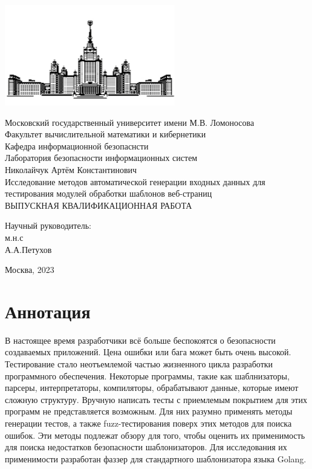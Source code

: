 \documentclass[a4paper]{article}
\begin{document}
 
\begin{center}
\includegraphics{MSU}

\hfill \break
\normalsize{Московский государственный университет имени М.В. Ломоносова}\\
\normalsize{Факультет вычислительной математики и кибернетики}\\
\normalsize{Кафедра информационной безопаснсти}\\
\normalsize{Лаборатория безопасности информационных систем}\\
 \hfill \break
\normalsize{Николайчук Артём Константинович}\\
\hfill\break
\hfill \break
\hfill \break
\hfill \break
\large{Исследование методов автоматической генерации входных данных для тестирования модулей обработки шаблонов веб-страниц}\\
\hfill \break
\hfill \break
\hfill \break
\normalsize{ВЫПУСКНАЯ КВАЛИФИКАЦИОННАЯ РАБОТА}\\
\hfill \break
\hfill \break
\hfill \break
\hfill \break
\hfill \break
\hfill \break
\hfill \break
\hfill \break
\begin{flushright}
    \normalsize{Научный руководитель:}\\
    \normalsize{м.н.с}\\
    \normalsize{А.А.Петухов}\\
\end{flushright}
\end{center}
\vspace*{\fill}
\begin{center} Москва, 2023 \end{center}
\thispagestyle{empty}
 
\newpage
\section*{Аннотация}
\indent

В настоящее время разработчики всё больше беспокоятся о безопасности создаваемых приложений. Цена ошибки или бага может быть очень высокой. Тестирование стало неотъемлемой частью жизненного цикла разработки программного обеспечения. Некоторые программы, такие как шаблнизаторы, парсеры, интерпретаторы, компиляторы, обрабатывают данные, которые имеют сложную структуру. Вручную написать тесты с приемлемым покрытием для этих программ не представляется возможным. Для них разумно применять методы
генерации тестов, а также fuzz-тестирования поверх этих методов для
поиска ошибок. Эти методы подлежат обзору для того, чтобы оценить их
применимость для поиска недостатков безопасности шаблонизаторов. Для исследования их применимости разработан фаззер для стандартного шаблонизатора языка Golang.
\newpage
    \tableofcontents
\newpage
 
\end{document}
